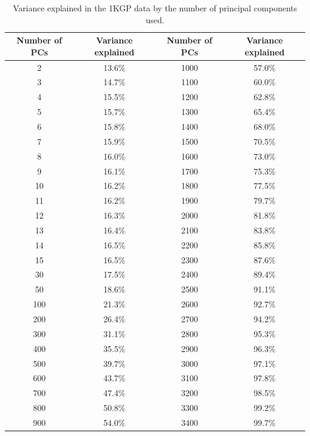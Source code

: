 \begin{table}[htb!]
\centering
 \begin{tabular}{||c c c c||} 
 \hline
 Number of PCs & Variance explained & Number of PCs & Variance explained  \\ [0.5ex] 
 \hline\hline
 2 & 13.6\% & 1000 & 57.0\% \\
\hline
3 & 14.7\% & 1100 & 60.0\%\\
\hline
4 & 15.5\% & 1200 & 62.8\%  \\
\hline
5 & 15.7\% & 1300 & 65.4\%\\
\hline
6 & 15.8\% & 1400 & 68.0\% \\
\hline
7 & 15.9\% & 1500 & 70.5\%\\
\hline
8 & 16.0\% & 1600 & 73.0\% \\
\hline
9 & 16.1\% & 1700 & 75.3\%\\
\hline
10 & 16.2\% & 1800 & 77.5\% \\
\hline
11 & 16.2\% & 1900 & 79.7\%\\
\hline
12 & 16.3\% & 2000 & 81.8\% \\
\hline
13 & 16.4\% & 2100 & 83.8\%\\
\hline
14 & 16.5\% & 2200 & 85.8\%\\
\hline
15 & 16.5\% & 2300 & 87.6\%\\
\hline
30 & 17.5\% & 2400 & 89.4\%\\
\hline
50 & 18.6\% & 2500 & 91.1\% \\
\hline
100 & 21.3\% & 2600 & 92.7\% \\
\hline
200 & 26.4\% & 2700 & 94.2\%\\
\hline
300 & 31.1\% & 2800 & 95.3\%\\
\hline
400 & 35.5\% & 2900 & 96.3\%\\
\hline
500 & 39.7\% & 3000 & 97.1\% \\
\hline
600 & 43.7\% & 3100 & 97.8\%\\
\hline
700 & 47.4\% & 3200 & 98.5\%\\
\hline
800 & 50.8\% & 3300 & 99.2\%\\
\hline
900 & 54.0\% & 3400 & 99.7\%\\[1ex] 
 \hline
 \end{tabular}
 \caption{Variance explained in the 1KGP data by the number of principal components used.}
 \label{table:1KGP_var_exp}
\end{table}